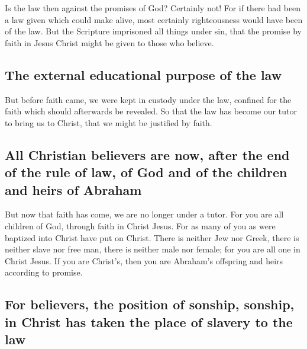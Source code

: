  Is the law then against the promises of God? Certainly
not! For if there had been a law given which could make alive, most
certainly righteousness would have been of the law.  But
the Scripture imprisoned all things under sin, that the promise by faith
in Jesus Christ might be given to those who believe.

\hypertarget{the-external-educational-purpose-of-the-law}{%
\subsection{The external educational purpose of the
law}\label{the-external-educational-purpose-of-the-law}}

 But before faith came, we were kept in custody under the
law, confined for the faith which should afterwards be revealed.
 So that the law has become our tutor to bring us to
Christ, that we might be justified by faith.

\hypertarget{all-christian-believers-are-now-after-the-end-of-the-rule-of-law-of-god-and-of-the-children-and-heirs-of-abraham}{%
\subsection{All Christian believers are now, after the end of the rule
of law, of God and of the children and heirs of
Abraham}\label{all-christian-believers-are-now-after-the-end-of-the-rule-of-law-of-god-and-of-the-children-and-heirs-of-abraham}}

 But now that faith has come, we are no longer under a
tutor.  For you are all children of God, through faith in
Christ Jesus.  For as many of you as were baptized into
Christ have put on Christ.  There is neither Jew nor
Greek, there is neither slave nor free man, there is neither male nor
female; for you are all one in Christ Jesus.  If you are
Christ's, then you are Abraham's offspring and heirs according to
promise.

\hypertarget{for-believers-the-position-of-sonship-sonship-in-christ-has-taken-the-place-of-slavery-to-the-law}{%
\subsection{For believers, the position of sonship, sonship, in Christ
has taken the place of slavery to the
law}\label{for-believers-the-position-of-sonship-sonship-in-christ-has-taken-the-place-of-slavery-to-the-law}}

